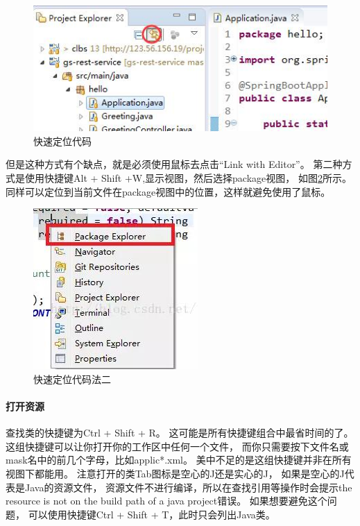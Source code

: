 \documentclass{book}
\begin{document}
\begin{figure}[htbp]
	\centering
	\includegraphics[scale=0.6]{EclipseLinkEditor.jpg}
	\caption{快速定位代码}
	\label{code:EclipseLinkEditor}
\end{figure}

但是这种方式有个缺点，就是必须使用鼠标去点击“Link with Editor”。
第二种方式是使用快捷键Alt + Shift +W,显示视图，然后选择package视图，
如图\ref{code:LocateSourceCode}所示。
同样可以定位到当前文件在package视图中的位置，这样就避免使用了鼠标。

\begin{figure}[htbp]
	\centering
	\includegraphics[scale=0.6]{LocateSourceCode.jpg}
	\caption{快速定位代码法二}
	\label{code:LocateSourceCode}
\end{figure}

\paragraph{打开资源}

查找类的快捷键为Ctrl + Shift + R。
这可能是所有快捷键组合中最省时间的了。这组快捷键可以让你打开你的工作区中任何一个文件，
而你只需要按下文件名或mask名中的前几个字母，比如applic*.xml。
美中不足的是这组快捷键并非在所有视图下都能用。
注意打开的类Tab图标是空心的J还是实心的J，
如果是空心的J代表是Java的资源文件，
资源文件不进行编译，所以在查找引用等操作时会提示the resource is not on the build path of a java project错误。
如果想要避免这个问题，
可以使用快捷键Ctrl + Shift + T，此时只会列出Java类。
\end{document}
